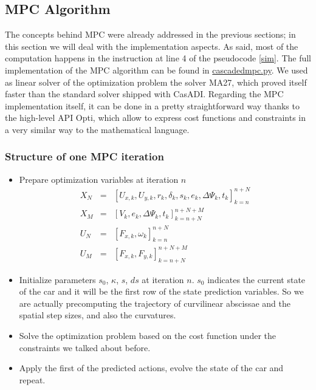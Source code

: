 \documentclass[a4paper, onecolumn, 12pt]{article}
\begin{document}
\subsection{MPC Algorithm}
The concepts behind MPC were already addressed in the previous sections; in this
section we will deal with the implementation aspects. As said, most of the
computation happens in the instruction at line 4 of the pseudocode \ref{sim}.
The full implementation of the MPC algorithm can be found in
\href{https://github.com/neverorfrog/vehicle-control/tree/main/controllers/mpc}{cascadedmpc.py}.
We used as linear solver of the optimization problem the solver MA27, which
proved itself faster than the standard solver shipped with CasADI. Regarding the
MPC implementation itself, it can be done in a pretty straightforward way thanks
to the high-level API Opti, which allow to express cost functions and
constraints in a very similar way to the mathematical language.\\
\subsubsection*{Structure of one MPC iteration}
\begin{itemize}
    \item Prepare optimization variables at iteration $n$
    \begin{subequations}
        \begin{eqnarray}
            X_N &=& [U_{x,k}, U_{y,k}, r_k, \delta_k, s_k, e_k, \Delta \varPsi_k, t_k]_{k=n}^{n+N} \\
            X_M &=& [V_k, e_k, \Delta \varPsi_k, t_k]_{k=n+N}^{n+N+M} \\
            U_N &=& [F_{x,k}, \omega_k]_{k=n}^{n+N} \\
            U_M &=& [F_{x,k}, F_{y,k}]_{k=n+N}^{n+N+M}
        \end{eqnarray}
    \end{subequations}
    \item Initialize parameters $s_0$, $\kappa$, $s$, $ds$ at iteration $n$.
    $s_0$ indicates the current state of the car and it will be the first row of
    the state prediction variables. So we are actually precomputing the
    trajectory of curvilinear abscissae and the spatial step sizes, and also the
    curvatures.
    \item Solve the optimization problem based on the cost function under the
    constraints we talked about before.
    \item Apply the first of the predicted actions, evolve the state of the car and repeat.

\end{itemize}
\end{document}
